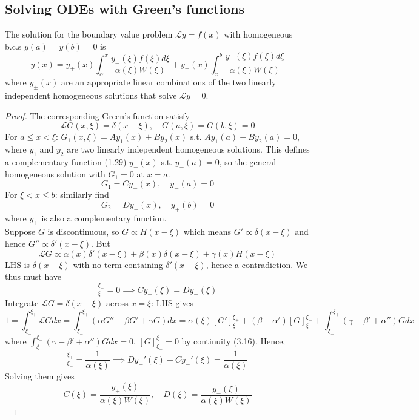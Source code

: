 \documentclass[a4paper]{article}
\begin{document}
\subsection{Solving ODEs with Green's functions}
\begin{prop}
The solution for the boundary value problem $\mathcal{L}y=f(x)$ with homogeneous b.c.s $y(a)=y(b)=0$ is 
\begin{equation}
    y(x)=y_+(x)\int_\alpha^x\frac{y_-(\xi)f(\xi)d\xi}{\alpha(\xi)W(\xi)}+y_-(x)\int_x^b\frac{y_+(\xi)f(\xi)d\xi}{\alpha(\xi)W(\xi)}\tag{3.15}
\end{equation}
where $y_\pm(x)$ are an appropriate linear combinations of the two linearly independent homogeneous solutions that solve $\mathcal{L}y=0$.
\end{prop}
\begin{proof}
The corresponding Green's function satisfy
$$\mathcal{L}G(x,\xi)=\delta(x-\xi),\quad G(a,\xi)=G(b,\xi)=0$$
For $a\leq x<\xi$: $G_1(x,\xi)=Ay_1(x)+By_2(x)$ s.t. $Ay_1(a)+By_2(a)=0$, where $y_1$ and $y_2$ are two linearly independent homogeneous solutions. This defines a complementary function (1.29) $y_-(x)$ s.t. $y_-(a)=0$, so the general homogeneous solution with $G_1=0$ at $x=a$.
$$ G_1=Cy_-(x),\quad y_-(a)=0$$
For $\xi<x\leq b$: similarly find 
$$G_2=Dy_+(x),\quad y_+(b)=0$$
where $y_+$ is also a complementary function.\\[5pt]
Suppose $G$ is discontinuous, so $G\propto H(x-\xi)$ which means $G'\propto \delta(x-\xi)$ and hence $G''\propto\delta'(x-\xi)$. But
$$\mathcal{L}G\propto\alpha(x)\delta'(x-\xi)+\beta(x)\delta(x-\xi)+\gamma(x)H(x-\xi)$$
LHS is $\delta(x-\xi)$ with no term containing $\delta'(x-\xi)$, hence a contradiction. We thus must have 
\begin{equation}
[G]_{\xi_-}^{\xi_+}=0\implies Cy_-(\xi)=Dy_+(\xi)\tag{3.16}
\end{equation}
Integrate $\mathcal{L}G=\delta(x-\xi)$ across $x=\xi$: LHS gives
$$1=\int_{\xi_-}^{\xi_+}\mathcal{L}Gdx=\int_{\xi_-}^{\xi_+}(\alpha G''+\beta G'+\gamma G)dx=\alpha(\xi)[G']_{\xi_-}^{\xi_+}+(\beta-\alpha')[G]_{\xi_-}^{\xi_+}+\int_{\xi_-}^{\xi_+}(\gamma-\beta'+\alpha'')Gdx$$
where $\int_{\xi_-}^{\xi_+}(\gamma-\beta'+\alpha'')Gdx=0$, $[G]_{\xi_-}^{\xi_+}=0$ by continuity (3.16). Hence, 
\begin{equation}
    [G']_{\xi_-}^{\xi_+}=\frac{1}{\alpha(\xi)}\implies Dy_+'(\xi)-Cy_-'(\xi)=\frac{1}{\alpha(\xi)}\tag{3.17}
\end{equation}
Solving them gives
$$
    C(\xi)=\frac{y_+(\xi)}{\alpha(\xi)W(\xi)},\quad D(\xi)=\frac{y_-(\xi)}{\alpha(\xi)W(\xi)}$$

\end{proof}
\end{document}
